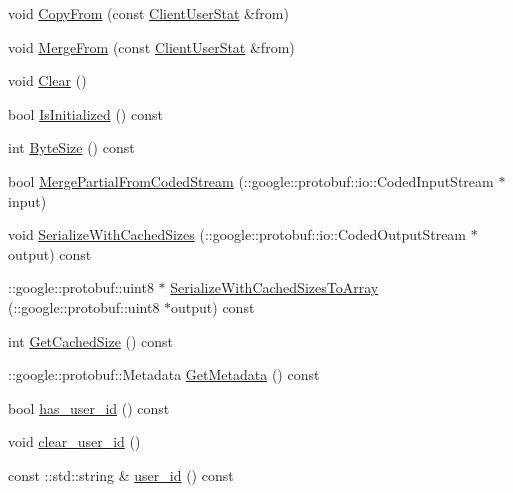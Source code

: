 \begin{DoxyCompactItemize}
void \hyperlink{class_i_m_1_1_base_define_1_1_client_user_stat_a633f0cec22ea1df7d6302a97f0c0da9f}{Copy\+From} (const \hyperlink{class_i_m_1_1_base_define_1_1_client_user_stat}{Client\+User\+Stat} \&from)
\item 
void \hyperlink{class_i_m_1_1_base_define_1_1_client_user_stat_a98aa30a5f6f49f5bf942e4139eb0fbfb}{Merge\+From} (const \hyperlink{class_i_m_1_1_base_define_1_1_client_user_stat}{Client\+User\+Stat} \&from)
\item 
void \hyperlink{class_i_m_1_1_base_define_1_1_client_user_stat_ab4f7837f3a38a65727528ee34e22d3c8}{Clear} ()
\item 
bool \hyperlink{class_i_m_1_1_base_define_1_1_client_user_stat_a0a82d2e6dacde46b1e5cc06d2f32aa3c}{Is\+Initialized} () const 
\item 
int \hyperlink{class_i_m_1_1_base_define_1_1_client_user_stat_a82de32b09acb49feb4e1c98e95541425}{Byte\+Size} () const 
\item 
bool \hyperlink{class_i_m_1_1_base_define_1_1_client_user_stat_ad2b93cdcec1d1226f0cc7a9dd6c68c01}{Merge\+Partial\+From\+Coded\+Stream} (\+::google\+::protobuf\+::io\+::\+Coded\+Input\+Stream $\ast$input)
\item 
void \hyperlink{class_i_m_1_1_base_define_1_1_client_user_stat_a6fa7a86f8ea699631b83f648b25ecf51}{Serialize\+With\+Cached\+Sizes} (\+::google\+::protobuf\+::io\+::\+Coded\+Output\+Stream $\ast$output) const 
\item 
\+::google\+::protobuf\+::uint8 $\ast$ \hyperlink{class_i_m_1_1_base_define_1_1_client_user_stat_a1270abcb15dba196b5853b439a1867bc}{Serialize\+With\+Cached\+Sizes\+To\+Array} (\+::google\+::protobuf\+::uint8 $\ast$output) const 
\item 
int \hyperlink{class_i_m_1_1_base_define_1_1_client_user_stat_acfc65f8dcaaacc34916d1d5b1b0fe976}{Get\+Cached\+Size} () const 
\item 
\+::google\+::protobuf\+::\+Metadata \hyperlink{class_i_m_1_1_base_define_1_1_client_user_stat_a2b663e494e4fc43ed002c601aa79911f}{Get\+Metadata} () const 
\item 
bool \hyperlink{class_i_m_1_1_base_define_1_1_client_user_stat_a0733b0e9e0e2fe63c6ab4b9dd225ad48}{has\+\_\+user\+\_\+id} () const 
\item 
void \hyperlink{class_i_m_1_1_base_define_1_1_client_user_stat_a52581632784517312085997a1de33caa}{clear\+\_\+user\+\_\+id} ()
\item 
const \+::std\+::string \& \hyperlink{class_i_m_1_1_base_define_1_1_client_user_stat_a347989e1c4df35415d5f9eb32696e60b}{user\+\_\+id} () const 

\end{DoxyCompactItemize}
